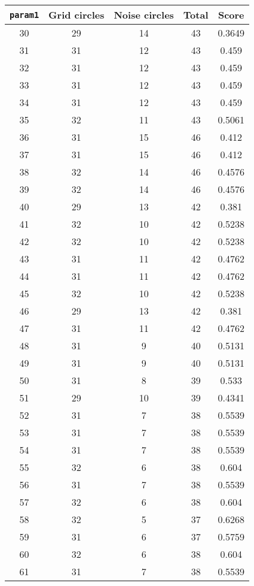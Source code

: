 \documentclass[letterpaper, 12pt]{article}
\begin{document}
\begin{longtable}{|c|c|c|c|c|}
\hline
\textbf{\texttt{param1}} & \textbf{Grid circles} & \textbf{Noise circles} & \textbf{Total} & \textbf{Score} \\
\hline
30 & 29 & 14 & 43 & 0.3649 \\
\hline
31 & 31 & 12 & 43 & 0.459 \\
\hline
32 & 31 & 12 & 43 & 0.459 \\
\hline
33 & 31 & 12 & 43 & 0.459 \\
\hline
34 & 31 & 12 & 43 & 0.459 \\
\hline
35 & 32 & 11 & 43 & 0.5061 \\
\hline
36 & 31 & 15 & 46 & 0.412 \\
\hline
37 & 31 & 15 & 46 & 0.412 \\
\hline
38 & 32 & 14 & 46 & 0.4576 \\
\hline
39 & 32 & 14 & 46 & 0.4576 \\
\hline
40 & 29 & 13 & 42 & 0.381 \\
\hline
41 & 32 & 10 & 42 & 0.5238 \\
\hline
42 & 32 & 10 & 42 & 0.5238 \\
\hline
43 & 31 & 11 & 42 & 0.4762 \\
\hline
44 & 31 & 11 & 42 & 0.4762 \\
\hline
45 & 32 & 10 & 42 & 0.5238 \\
\hline
46 & 29 & 13 & 42 & 0.381 \\
\hline
47 & 31 & 11 & 42 & 0.4762 \\
\hline
48 & 31 & 9 & 40 & 0.5131 \\
\hline
49 & 31 & 9 & 40 & 0.5131 \\
\hline
50 & 31 & 8 & 39 & 0.533 \\
\hline
51 & 29 & 10 & 39 & 0.4341 \\
\hline
52 & 31 & 7 & 38 & 0.5539 \\
\hline
53 & 31 & 7 & 38 & 0.5539 \\
\hline
54 & 31 & 7 & 38 & 0.5539 \\
\hline
55 & 32 & 6 & 38 & 0.604 \\
\hline
56 & 31 & 7 & 38 & 0.5539 \\
\hline
57 & 32 & 6 & 38 & 0.604 \\
\hline
58 & 32 & 5 & 37 & 0.6268 \\
\hline
59 & 31 & 6 & 37 & 0.5759 \\
\hline
60 & 32 & 6 & 38 & 0.604 \\
\hline
61 & 31 & 7 & 38 & 0.5539 \\

\end{longtable}
\end{document}
